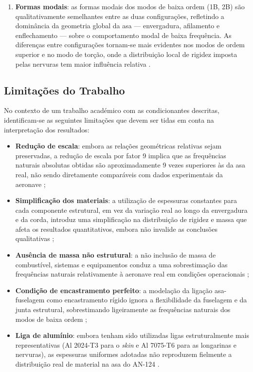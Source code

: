 \documentclass[a4paper,fleqn,noprintline]{cas-dc}
\begin{document}
\begin{enumerate}
    \item \textbf{Formas modais}: as formas modais dos modos de baixa ordem (1B, 2B) são qualitativamente semelhantes entre as duas configurações, refletindo a dominância da geometria global da asa --- envergadura, afilamento e enflechamento --- sobre o comportamento modal de baixa frequência. As diferenças entre configurações tornam-se mais evidentes nos modos de ordem superior e no modo de torção, onde a distribuição local de rigidez imposta pelas nervuras tem maior influência relativa \cite{Bisplinghoff1996, Dowell2004}.
\end{enumerate}

\subsection{Limitações do Trabalho}

No contexto de um trabalho académico com as condicionantes descritas, identificam-se as seguintes limitações que devem ser tidas em conta na interpretação dos resultados:

\begin{itemize}
    \item \textbf{Redução de escala}: embora as relações geométricas relativas sejam preservadas, a redução de escala por fator 9 implica que as frequências naturais absolutas obtidas são aproximadamente 9 vezes superiores às da asa real, não sendo diretamente comparáveis com dados experimentais da aeronave \cite{Craig2006};

    \item \textbf{Simplificação dos materiais}: a utilização de espessuras constantes para cada componente estrutural, em vez da variação real ao longo da envergadura e da corda, introduz uma simplificação na distribuição de rigidez e massa que afeta os resultados quantitativos, embora não invalide as conclusões qualitativas \cite{Megson2012};

    \item \textbf{Ausência de massa não estrutural}: a não inclusão de massa de combustível, sistemas e equipamentos conduz a uma sobrestimação das frequências naturais relativamente à aeronave real em condições operacionais \cite{Wright2015};

    \item \textbf{Condição de encastramento perfeito}: a modelação da ligação asa-fuselagem como encastramento rígido ignora a flexibilidade da fuselagem e da junta estrutural, sobrestimando ligeiramente as frequências naturais dos modos de baixa ordem \cite{Hodges2011};

    \item \textbf{Liga de alumínio}: embora tenham sido utilizadas ligas estruturalmente mais representativas (Al 2024-T3 para o \textit{skin} e Al 7075-T6 para as longarinas e nervuras), as espessuras uniformes adotadas não reproduzem fielmente a distribuição real de material na asa do AN-124 \cite{Megson2012, ASM2008}.
\end{itemize}
\end{document}
